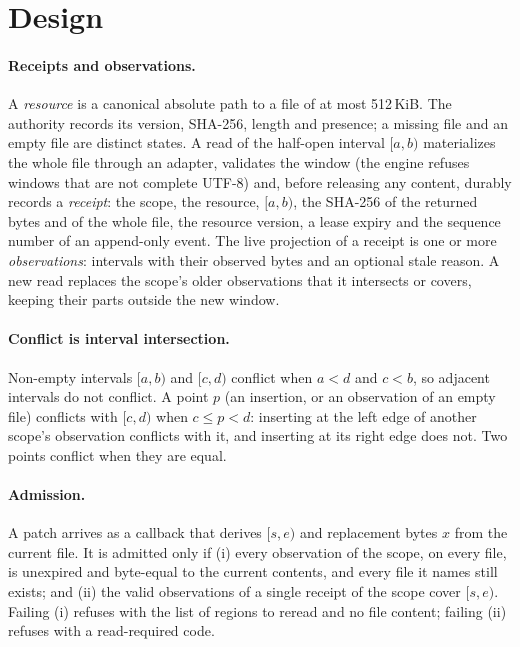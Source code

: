 \documentclass[10pt]{article}
\begin{document}
\section{Design}\label{sec:design}

\paragraph{Receipts and observations.}
A \emph{resource} is a canonical absolute path to a file of at most 512\,KiB. The authority records its version, SHA-256, length and presence; a missing file and an empty file are distinct states. A read of the half-open interval $[a,b)$ materializes the whole file through an adapter, validates the window (the engine refuses windows that are not complete UTF-8) and, before releasing any content, durably records a \emph{receipt}: the scope, the resource, $[a,b)$, the SHA-256 of the returned bytes and of the whole file, the resource version, a lease expiry and the sequence number of an append-only event. The live projection of a receipt is one or more \emph{observations}: intervals with their observed bytes and an optional stale reason. A new read replaces the scope's older observations that it intersects or covers, keeping their parts outside the new window.

\paragraph{Conflict is interval intersection.}
Non-empty intervals $[a,b)$ and $[c,d)$ conflict when $a<d$ and $c<b$, so adjacent intervals do not conflict. A point $p$ (an insertion, or an observation of an empty file) conflicts with $[c,d)$ when $c \le p < d$: inserting at the left edge of another scope's observation conflicts with it, and inserting at its right edge does not. Two points conflict when they are equal.

\paragraph{Admission.}
A patch arrives as a callback that derives $[s,e)$ and replacement bytes $x$ from the current file. It is admitted only if (i) every observation of the scope, on every file, is unexpired and byte-equal to the current contents, and every file it names still exists; and (ii) the valid observations of a single receipt of the scope cover $[s,e)$. Failing (i) refuses with the list of regions to reread and no file content; failing (ii) refuses with a read-required code.
\end{document}

